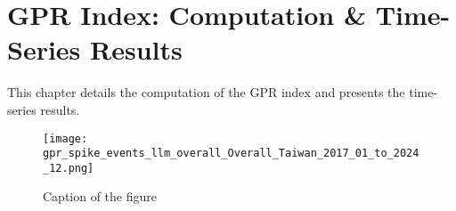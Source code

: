 
\chapter{GPR Index: Computation \& Time-Series Results}

This chapter details the computation of the GPR index and presents the time-series results.

\begin{figure}[htbp]
  \centering
  \texttt{[image: gpr\_spike\_events\_llm\_overall\_Overall\_Taiwan\_2017\_01\_to\_2024\_12.png]}
  \caption{Caption of the figure}
  \label{fig:my_example}
\end{figure}
